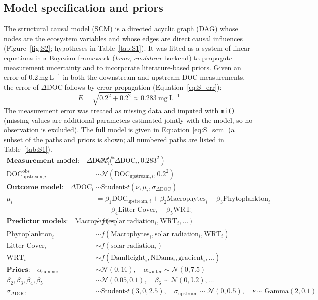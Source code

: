 \documentclass[11pt,a4paper]{article}
\begin{document}
\subsection{Model specification and priors}
The structural causal model (SCM) is a directed acyclic graph (DAG) whose nodes are the ecosystem variables and whose edges are direct causal influences (Figure~\ref{fig:S2}; hypotheses in Table~\ref{tab:S1}). It was fitted as a system of linear equations in a Bayesian framework (\emph{brms}, \emph{cmdstanr} backend) to propagate measurement uncertainty and to incorporate literature-based priors. Given an error of 0.2\,mg\,L$^{-1}$ in both the downstream and upstream DOC measurements, the error of $\Delta$DOC follows by error propagation (Equation~\ref{eq:S_err}):
\begin{equation}
E = \sqrt{0.2^{2} + 0.2^{2}} \approx 0.283\ \text{mg}\ \text{L}^{-1}
\label{eq:S_err}
\end{equation}
The measurement error was treated as missing data and imputed with \texttt{mi()} (missing values are additional parameters estimated jointly with the model, so no observation is excluded). The full model is given in Equation~\ref{eq:S_scm} (a subset of the paths and priors is shown; all numbered paths are listed in Table~\ref{tab:S1}).
\begin{equation}
\begin{aligned}
\textbf{Measurement model:} \quad
\Delta \text{DOC}_i^{\text{obs}} &\sim \mathcal{N}(\Delta \text{DOC}_i, 0.283^2) \\
\text{DOC}_{\text{upstream},i}^{\text{obs}} &\sim \mathcal{N}(\text{DOC}_{\text{upstream},i}, 0.2^2) \\[0.5em]
\textbf{Outcome model:} \quad
\Delta \text{DOC}_i &\sim \text{Student-}t(\nu, \mu_i, \sigma_{\Delta \text{DOC}}) \\
\mu_i &= \beta_1 \text{DOC}_{\text{upstream}, i} + \beta_2 \text{Macrophytes}_i + \beta_3 \text{Phytoplankton}_i \\
&\quad + \beta_4 \text{Litter Cover}_i + \beta_5 \text{WRT}_i \\[0.5em]
\textbf{Predictor models:} \quad
\text{Macrophytes}_i &\sim f(\text{solar radiation}_i, \text{WRT}_i, \dots) \\
\text{Phytoplankton}_i &\sim f(\text{Macrophytes}_i, \text{solar radiation}_i, \text{WRT}_i) \\
\text{Litter Cover}_i &\sim f(\text{solar radiation}_i) \\
\text{WRT}_i &\sim f(\text{DamHeight}_i, \text{NDams}_i, \text{gradient}_i, \dots) \\[0.5em]
\textbf{Priors:} \quad
\alpha_{\text{summer}} &\sim \mathcal{N}(0, 10), \quad \alpha_{\text{winter}} \sim \mathcal{N}(0, 7.5) \\
\beta_2, \beta_3, \beta_4, \beta_5 &\sim \mathcal{N}(0.05, 0.1), \quad \beta_6 \sim \mathcal{N}(0, 0.2), \dots \\
\sigma_{\Delta \text{DOC}} &\sim \text{Student-}t(3, 0, 2.5), \quad
\sigma_{\text{upstream}} \sim \mathcal{N}(0, 0.5), \quad
\nu \sim \text{Gamma}(2, 0.1)
\end{aligned}
\label{eq:S_scm}
\end{equation}
\end{document}
